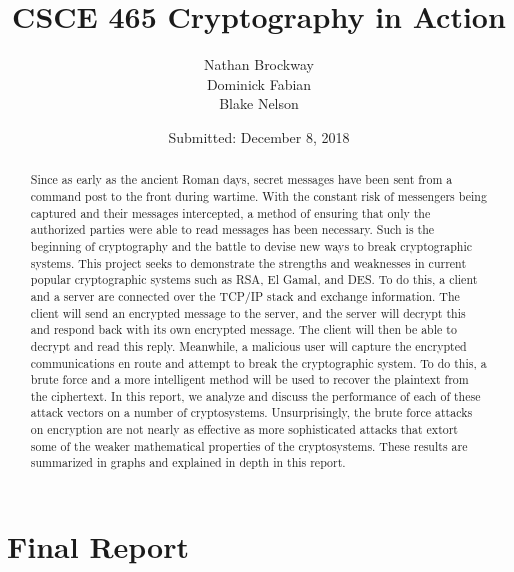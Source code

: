 \documentclass[12pt]{report}
\title{CSCE 465 Cryptography in Action}
\date{}
\begin{document}
\maketitle

\newpage
\author{Nathan Brockway\\Dominick Fabian\\Blake Nelson}
\date{Submitted: December 8, 2018}
\maketitle

\tableofcontents
\newpage

\begin{abstract}
    Since as early as the ancient Roman days, secret messages have been sent from a command post to the front during wartime. With the constant risk of messengers
    being captured and their messages intercepted, a method of ensuring that only the authorized parties were able to read messages has been necessary. Such is the
    beginning of cryptography and the battle to devise new ways to break cryptographic systems. This project seeks to demonstrate the strengths and weaknesses in
    current popular cryptographic systems such as RSA, El Gamal, and DES. To do this, a client and a server are connected over the TCP/IP stack and exchange
    information. The client will send an encrypted message to the server, and the server will decrypt this and respond back with its own encrypted message. The
    client will then be able to decrypt and read this reply. Meanwhile, a malicious user will capture the encrypted communications en route and attempt to break the
    cryptographic system. To do this, a brute force and a more intelligent method will be used to recover the plaintext from the ciphertext. In this report, we
    analyze and discuss the performance of each of these attack vectors on a number of cryptosystems. Unsurprisingly, the brute force attacks on encryption are not
    nearly as effective as more sophisticated attacks that extort some of the weaker mathematical properties of the cryptosystems. These results are summarized in
    graphs and explained in depth in this report.
\end{abstract}


\chapter{Final Report}
\end{document}
